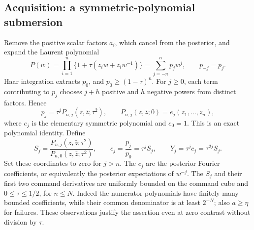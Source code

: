 \subsection{Acquisition: a symmetric-polynomial submersion}
Remove the positive scalar factors $a_i$, which cancel from the posterior,
and expand the Laurent polynomial
\begin{equation}\label{eq:circle-laurent}
 P(w)=\prod_{i=1}^n\{1+\tau(z_iw+\bar z_iw^{-1})\}
     =\sum_{j=-n}^{n}p_jw^j,
 \qquad p_{-j}=\bar p_j.
\end{equation}
Haar integration extracts $p_0$, and $p_0\ge(1-\tau)^n$.
For $j\ge0$, each term contributing to $p_j$ chooses $j+h$ positive
and $h$ negative powers from distinct factors. Hence
\begin{equation}\label{eq:circle-coefficient-factorization}
 p_j=\tau^j P_{n,j}(z,\bar z;\tau^2),\qquad
 P_{n,j}(z,\bar z;0)=e_j(z_1,\ldots,z_n),
\end{equation}
where $e_j$ is the elementary symmetric polynomial and $e_0=1$.
This is an exact polynomial identity. Define
\[
 S_j=\frac{P_{n,j}(z,\bar z;\tau^2)}{P_{n,0}(z,\bar z;\tau^2)},
 \qquad c_j=\frac{p_j}{p_0}=\tau^jS_j,
 \qquad Y_j=\tau^jc_j=\tau^{2j}S_j.
\]
Set these coordinates to zero for $j>n$. The $c_j$ are the posterior
Fourier coefficients, or equivalently the posterior expectations of
$w^{-j}$. The $S_j$ and their first two command derivatives are uniformly
bounded on the command cube and $0\le\tau\le1/2$, for $n\le N$.
Indeed the numerator polynomials have finitely many bounded coefficients,
while their common denominator is at least $2^{-N}$; also $a\ge\eta$
for failures. These observations justify the assertion even at zero
contrast without division by $\tau$.

